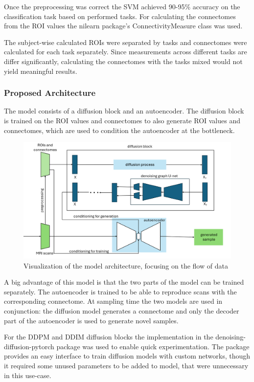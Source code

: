 	Once the preprocessing was correct the SVM achieved 90-95\% accuracy on the classification task based on performed tasks. For calculating the connectomes from the ROI values the nilearn package’s ConnectivityMeasure class was used. 
	
	The subject-wise calculated ROIs were separated by tasks and connectomes were calculated for each task separately. Since measurements across different tasks are differ significantly, calculating the connectomes with the tasks mixed would not yield meaningful results.
	
	\subsubsection{Proposed Architecture}
	
	The model consists of a diffusion block and an autoencoder. The diffusion block is trained on the ROI values and connectomes to also generate ROI values and connectomes, which are used to condition the autoencoder at the bottleneck.
	
	\begin{figure}[!h]
		\centering
		\includegraphics[width=\textwidth]{figures/architecture.png}
		\caption{Visualization of the model architecture, focusing on the flow of data}
	\end{figure}
	
	A big advantage of this model is that the two parts of the model can be trained separately. The autoencoder is trained to be able to reproduce scans with the corresponding connectome. At sampling time  the two models are used in conjunction: the diffusion model generates a connectome and only the decoder part of the autoencoder is used to generate novel samples.
	
	For the DDPM and DDIM diffusion blocks the implementation in the denoising-diffusion-pytorch package was used to enable quick experimentation. The package provides an easy interface to train diffusion models with custom networks, though it required some unused parameters to be added to model, that were unnecessary in this use-case.
	
